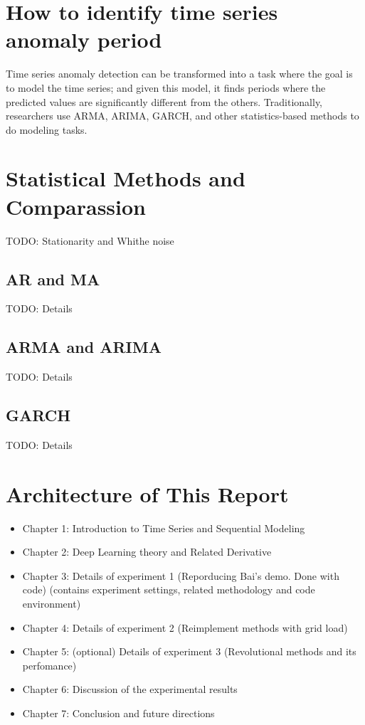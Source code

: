\section{How to identify time series anomaly period}

Time series anomaly detection can be transformed into a task where the goal is to model the time series; and given this model, it finds periods where the predicted values are significantly different from the others. Traditionally, researchers use ARMA, ARIMA, GARCH, and other statistics-based methods to do modeling tasks.

\section{Statistical Methods and Comparassion}
TODO: Stationarity and Whithe noise
\subsection{AR and MA}
TODO: Details
\subsection{ARMA and ARIMA}
TODO: Details
\subsection{GARCH}
TODO: Details


\section{Architecture of This Report}

\begin{itemize}
\item Chapter 1: Introduction to Time Series and Sequential Modeling
\item Chapter 2: Deep Learning theory and Related Derivative
\item Chapter 3: Details of experiment 1 (Reporducing Bai's demo. Done with code) (contains experiment settings, related methodology and code environment)
\item Chapter 4: Details of experiment 2 (Reimplement methods with grid load)
\item Chapter 5: (optional) Details of experiment 3 (Revolutional methods and its perfomance)
\item Chapter 6: Discussion of the experimental results
\item Chapter 7: Conclusion and future directions
\end{itemize}
